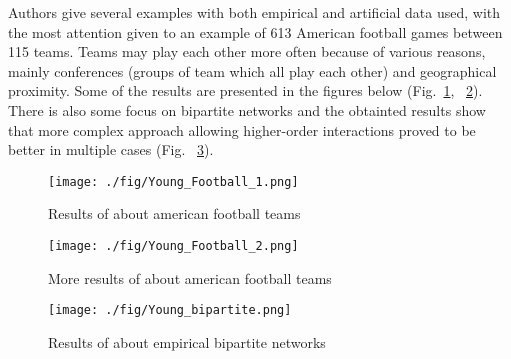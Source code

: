 \documentclass[a4paper,12pt]{article}
\theoremstyle{definition}
\theoremstyle{remark}
\begin{document}
\begin{itemize}
    Authors give several examples with both empirical and artificial data used, with the most attention given to an example of 613 American football games between 115 teams. Teams may play each other more often because of various reasons, mainly conferences (groups of team which all play each other) and geographical proximity. Some of the results are presented in the figures below (Fig.~\ref{Young_football_1}, ~\ref{Young_football_2}). There is also some focus on bipartite networks and the obtainted results show that more complex approach allowing higher-order interactions proved to be better in multiple cases (Fig. ~\ref{Young_bipartite}).

    \begin{figure}[h!]
	\begin{center}
        \texttt{[image: ./fig/Young\_Football\_1.png]}
        \caption{Results of \cite{Young2021} about american football teams} 
    	\label{Young_football_1}
    \end{center}
    \end{figure}

    \begin{figure}[h!]
	\begin{center}
        \texttt{[image: ./fig/Young\_Football\_2.png]}
        \caption{More results of \cite{Young2021} about american football teams} 
    	\label{Young_football_2}
    \end{center}
    \end{figure}

    \begin{figure}[h!]
	\begin{center}
        \texttt{[image: ./fig/Young\_bipartite.png]}
        \caption{Results of \cite{Young2021} about empirical bipartite networks} 
    	\label{Young_bipartite}
    \end{center}
    \end{figure}


\end{itemize}
\end{document}
